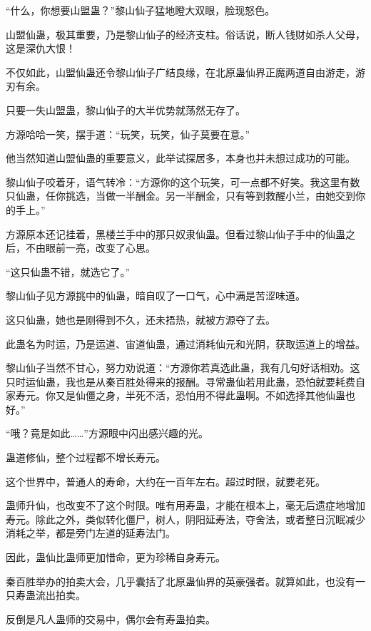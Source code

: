
\begin{this_body}

“什么，你想要山盟蛊？”黎山仙子猛地瞪大双眼，脸现怒色。

山盟仙蛊，极其重要，乃是黎山仙子的经济支柱。俗话说，断人钱财如杀人父母，这是深仇大恨！

不仅如此，山盟仙蛊还令黎山仙子广结良缘，在北原蛊仙界正魔两道自由游走，游刃有余。

只要一失山盟蛊，黎山仙子的大半优势就荡然无存了。

方源哈哈一笑，摆手道：“玩笑，玩笑，仙子莫要在意。”

他当然知道山盟仙蛊的重要意义，此举试探居多，本身也并未想过成功的可能。

黎山仙子咬着牙，语气转冷：“方源你的这个玩笑，可一点都不好笑。我这里有数只仙蛊，任你挑选，当做一半酬金。另一半酬金，只有等到救醒小兰，由她交到你的手上。”

方源原本还记挂着，黑楼兰手中的那只奴隶仙蛊。但看过黎山仙子手中的仙蛊之后，不由眼前一亮，改变了心思。

“这只仙蛊不错，就选它了。”

黎山仙子见方源挑中的仙蛊，暗自叹了一口气，心中满是苦涩味道。

这只仙蛊，她也是刚得到不久，还未捂热，就被方源夺了去。

此蛊名为时运，乃是运道、宙道仙蛊，通过消耗仙元和光阴，获取运道上的增益。

黎山仙子当然不甘心，努力劝说道：“方源你若真选此蛊，我有几句好话相劝。这只时运仙蛊，我也是从秦百胜处得来的报酬。寻常蛊仙若用此蛊，恐怕就要耗费自家寿元。你又是仙僵之身，半死不活，恐怕用不得此蛊啊。不如选择其他仙蛊也好。”

“哦？竟是如此……”方源眼中闪出感兴趣的光。

蛊道修仙，整个过程都不增长寿元。

这个世界中，普通人的寿命，大约在一百年左右。超过时限，就要老死。

蛊师升仙，也改变不了这个时限。唯有用寿蛊，才能在根本上，毫无后遗症地增加寿元。除此之外，类似转化僵尸，树人，阴阳延寿法，夺舍法，或者整日沉眠减少消耗之举，都是旁门左道的延寿法门。

因此，蛊仙比蛊师更加惜命，更为珍稀自身寿元。

秦百胜举办的拍卖大会，几乎囊括了北原蛊仙界的英豪强者。就算如此，也没有一只寿蛊流出拍卖。

反倒是凡人蛊师的交易中，偶尔会有寿蛊拍卖。


\end{this_body}
